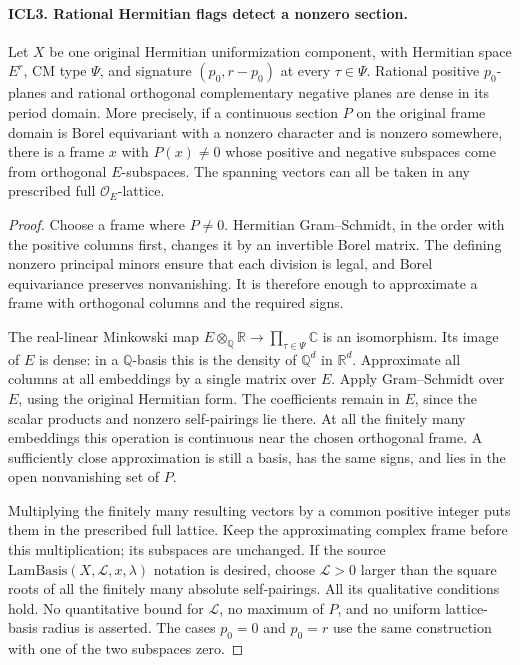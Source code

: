 \documentclass[11pt,a4paper]{article}
\numberwithin{equation}{section}
\theoremstyle{remark}\newtheorem{remark}[theorem]{Remark}
\begin{document}
\paragraph{ICL3. Rational Hermitian flags detect a nonzero section.}
\label{claim:ICL3}
Let \(X\) be one original Hermitian uniformization component, with
Hermitian space \(E^r\), CM type \(\Psi\), and signature
\((p_0,r-p_0)\) at every \(\tau\in\Psi\).  Rational positive
\(p_0\)-planes and rational orthogonal complementary negative planes
are dense in its period domain.  More precisely, if a continuous
section \(P\) on the original frame domain is Borel equivariant
with a nonzero character and is nonzero somewhere, there is a frame
\(x\) with \(P(x)\ne0\) whose positive and negative subspaces
come from orthogonal \(E\)-subspaces.  The spanning vectors can all
be taken in any prescribed full \(\mathcal O_E\)-lattice.
\begin{proof}
Choose a frame where \(P\ne0\).  Hermitian Gram--Schmidt, in the
order with the positive columns first, changes it by an invertible
Borel matrix.  The defining nonzero principal minors ensure that
each division is legal, and Borel equivariance preserves
nonvanishing.  It is therefore enough to approximate a frame with
orthogonal columns and the required signs.

The real-linear Minkowski map
\(E\otimes_{\mathbb Q}\mathbb R\to\prod_{\tau\in\Psi}\mathbb C\)
is an isomorphism.  Its image of \(E\) is dense: in a
\(\mathbb Q\)-basis this is the density of \(\mathbb Q^d\) in
\(\mathbb R^d\).  Approximate all columns at all embeddings by a
single matrix over \(E\).  Apply Gram--Schmidt over \(E\), using
the original Hermitian form.  The coefficients remain in \(E\),
since the scalar products and nonzero self-pairings lie there.
At all the finitely many embeddings this operation is continuous
near the chosen orthogonal frame.  A sufficiently close
approximation is still a basis, has the same signs, and lies in
the open nonvanishing set of \(P\).

Multiplying the finitely many resulting vectors by a common
positive integer puts them in the prescribed full lattice.  Keep
the approximating complex frame before this multiplication; its
subspaces are unchanged.  If the source
\(\mathrm{LamBasis}(X,\mathcal L,x,\lambda)\) notation is desired,
choose \(\mathcal L>0\) larger than the square roots of all the
finitely many absolute self-pairings.  All its qualitative
conditions hold.  No quantitative bound for \(\mathcal L\), no
maximum of \(P\), and no uniform lattice-basis radius is asserted.
The cases \(p_0=0\) and \(p_0=r\) use the same construction with
one of the two subspaces zero.
\end{proof}
\end{document}
